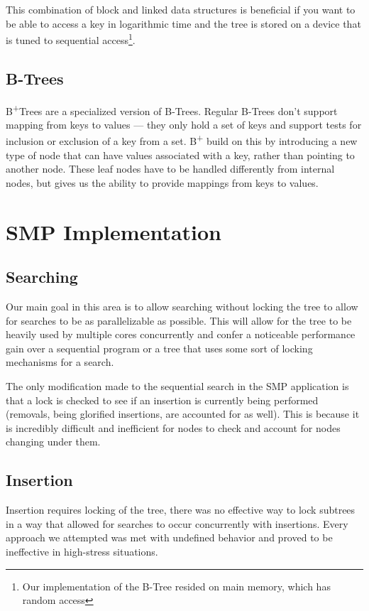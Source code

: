 \documentclass[conference]{IEEEtran}
\begin{document}
This combination of block and linked data structures is beneficial if you want
to be able to access a key in logarithmic time and the tree is stored on a
device that is tuned to sequential access\footnote{Our implementation of the
B-Tree resided on main memory, which has random access}.

\subsection{B-Trees}
B\textsuperscript{+}Trees are a specialized version of B-Trees. Regular B-Trees
don't support mapping from keys to values \---- they only hold a set of keys and
support tests for inclusion or exclusion of a key from a set.
B\textsuperscript{+} build on this by introducing a new type of node that can
have values associated with a key, rather than pointing to another node. These
leaf nodes have to be handled differently from internal nodes, but gives us the
ability to provide mappings from keys to values.

\section{SMP Implementation}
\subsection{Searching}
Our main goal in this area is to allow searching without locking the tree to
allow for searches to be as parallelizable as possible. This will allow for
the tree to be heavily used by multiple cores concurrently and confer a
noticeable performance gain over a sequential program or a tree that uses some
sort of locking mechanisms for a search.

The only modification made to the sequential search in the SMP application is
that a lock is checked to see if an insertion is currently being performed 
(removals, being glorified insertions, are accounted for as well). This is 
because it is incredibly difficult and inefficient for nodes to check and
account for nodes changing under them.
\subsection{Insertion}
Insertion requires locking of the tree, there was no effective way to lock 
subtrees in a way that allowed for searches to occur concurrently with
insertions. Every approach we attempted was met with undefined behavior and
proved to be ineffective in high-stress situations.
\end{document}
